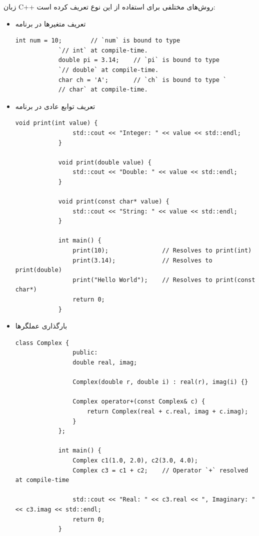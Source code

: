 \documentclass[12pt, a4paper]{report}
\begin{document}
زبان C++ روش‌های مختلفی برای استفاده از این نوع تعریف کرده است:
\begin{itemize}
	\item تعریف متغیر‌ها در برنامه
	\begin{LTR} %
		\begin{lstlisting}[breaklines=true]
			int num = 10;        // `num` is bound to type 
			`// int` at compile-time.
			double pi = 3.14;    // `pi` is bound to type 
			`// double` at compile-time.
			char ch = 'A';       // `ch` is bound to type `
			// char` at compile-time.
		\end{lstlisting}
	\end{LTR}
	
	
	\item تعریف توابع عادی در برنامه
	\begin{LTR} %
		\begin{lstlisting}[breaklines=true]
			void print(int value) {
				std::cout << "Integer: " << value << std::endl;
			}
			
			void print(double value) {
				std::cout << "Double: " << value << std::endl;
			}
			
			void print(const char* value) {
				std::cout << "String: " << value << std::endl;
			}
			
			int main() {
				print(10);               // Resolves to print(int)
				print(3.14);             // Resolves to print(double)
				print("Hello World");    // Resolves to print(const char*)
				return 0;
			}
		\end{lstlisting}
	\end{LTR}
	
	
	\item بارگذاری عملگرها
	\begin{LTR} %
		\begin{lstlisting}[breaklines=true]
			class Complex {
				public:
				double real, imag;
				
				Complex(double r, double i) : real(r), imag(i) {}
				
				Complex operator+(const Complex& c) {
					return Complex(real + c.real, imag + c.imag);
				}
			};
			
			int main() {
				Complex c1(1.0, 2.0), c2(3.0, 4.0);
				Complex c3 = c1 + c2;    // Operator `+` resolved at compile-time
				
				std::cout << "Real: " << c3.real << ", Imaginary: " << c3.imag << std::endl;
				return 0;
			}
			

\end{lstlisting}
\end{LTR}
\end{itemize}
\end{document}
